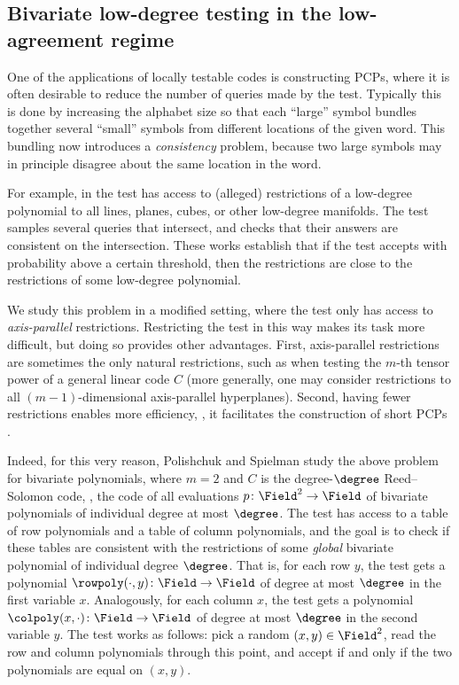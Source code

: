 \documentclass{toc}
\theoremstyle{plain}
\begin{document}
%
%
\subsection{Bivariate low-degree testing in the low-agreement regime}
\label{sec:bivariate-testing}

One of the applications of locally testable codes is constructing PCPs, where it is often desirable to reduce the number of queries made by the test. Typically this is done by increasing the alphabet size so that each ``large'' symbol bundles together several ``small'' symbols from different locations of the given word. This bundling now introduces a \emph{consistency} problem, because two large symbols may in principle disagree about the same location in the word.

For example, in \cite{RazS97,AroraS03,MoshkovitzR08-ldt,BhangaleDN17} the test has access to (alleged) restrictions of a low-degree polynomial to all lines, planes, cubes, or other low-degree manifolds. The test samples several queries that intersect, and checks that their answers are consistent on the intersection. These works establish that if the test accepts with probability above a certain threshold, then the restrictions are close to the restrictions of some low-degree polynomial.

We study this problem in a modified setting, where the test only has access to \emph{axis-parallel} restrictions. Restricting the test in this way makes its task more difficult, but doing so provides other advantages. First, axis-parallel restrictions are sometimes the only natural restrictions, such as when testing the
%
$m$-th tensor power                                                                 %
of a general linear code $C$ (more generally, one may consider restrictions to all $(m-1)$-dimensional axis-parallel hyperplanes). Second, having fewer restrictions enables more efficiency, \eg, it facilitates the construction of short PCPs \cite{PolishchukS94,BenSassonS08}.

Indeed, for this very reason, Polishchuk and Spielman \cite{PolishchukS94} study the above problem for bivariate polynomials, where $m=2$ and $C$ is the degree-$\degree$ Reed--Solomon code, \ie, the code of all evaluations $p \colon \Field^2 \to \Field$ of bivariate polynomials of individual degree at most $\degree$. The test has access to a table of row polynomials and a table of column polynomials, and the goal is to check if these tables are consistent with the restrictions of some \emph{global} bivariate polynomial of individual degree $\degree$. That is, for each row $y$, the test gets a polynomial $\rowpoly(\cdot,y) \colon \Field \to \Field$ of degree at most $\degree$ in the first variable $x$. Analogously, for each column $x$, the test gets a polynomial $\colpoly(x,\cdot) \colon \Field \to \Field$ of degree at most $\degree$ in the second variable $y$. The test works as follows: pick a random $(x,y) \in \Field^2$, read the row and column polynomials through this point, and accept if and only if the two polynomials are equal on $(x,y)$.
\end{document}
